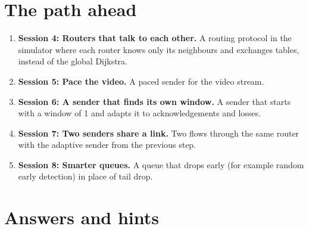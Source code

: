 \documentclass[11pt,a4paper]{article}
\begin{document}
\section{The path ahead}
\begin{enumerate}[nosep]
\item \textbf{Session 4: Routers that talk to each other.} A routing protocol in the simulator where each router knows only its neighbours and exchanges tables, instead of the global Dijkstra.
\item \textbf{Session 5: Pace the video.} A paced sender for the video stream.
\item \textbf{Session 6: A sender that finds its own window.} A sender that starts with a window of 1 and adapts it to acknowledgements and losses.
\item \textbf{Session 7: Two senders share a link.} Two flows through the same router with the adaptive sender from the previous step.
\item \textbf{Session 8: Smarter queues.} A queue that drops early (for example random early detection) in place of tail drop.
\end{enumerate}

\section{Answers and hints}
\end{document}
